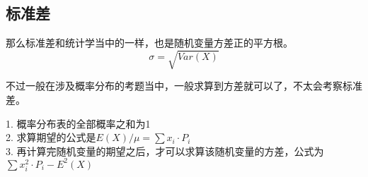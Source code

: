 \subsection*{标准差}
那么标准差和统计学当中的一样，也是随机变量方差正的平方根。
\[
	\sigma = \sqrt{Var(X)}
\]

不过一般在涉及概率分布的考题当中，一般求算到方差就可以了，不太会考察标准差。

\begin{SummBox}
1. 概率分布表的全部概率之和为1\\
2. 求算期望的公式是$E(X)/\mu = \sum x_i\cdot P_i$\\
3. 再计算完随机变量的期望之后，才可以求算该随机变量的方差，公式为$\sum x_i^2\cdot P_i - E^2(X)$
\end{SummBox}








